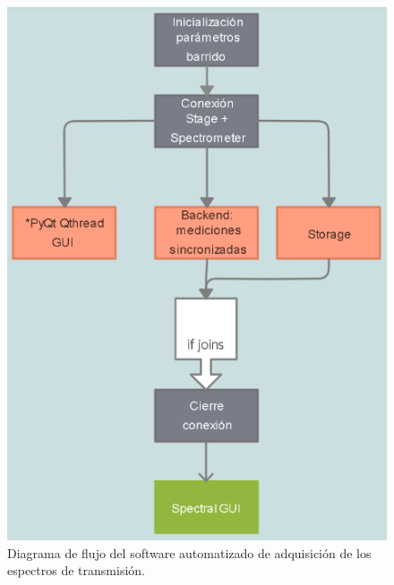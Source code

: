  \begin{figure}[H]
	\centering
	\includegraphics[scale=1.0]{Figs/microespectrometro/flowdiagprot0.png}
	\caption{Diagrama de flujo del software automatizado de adquisición de los espectros de transmisión.}
	\label{fig:ddinaaa}
\end{figure}

